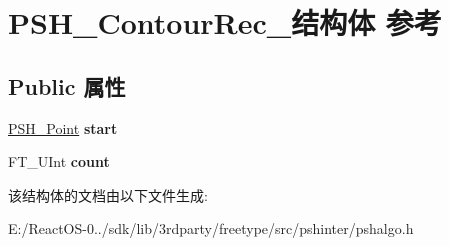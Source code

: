 \hypertarget{struct_p_s_h___contour_rec__}{}\section{P\+S\+H\+\_\+\+Contour\+Rec\+\_\+结构体 参考}
\label{struct_p_s_h___contour_rec__}
\subsection*{Public 属性}
\begin{DoxyCompactItemize}
\item 
\mbox{\label{struct_p_s_h___contour_rec___ada292eef1584e5f887bea69ba8703aa2}} 
\hyperlink{struct_p_s_h___point_rec__}{P\+S\+H\+\_\+\+Point} {\bfseries start}
\item 
\mbox{\label{struct_p_s_h___contour_rec___a5d45ebbfcc7c5cb394ddae2e1b9dacf3}} 
F\+T\+\_\+\+U\+Int {\bfseries count}
\end{DoxyCompactItemize}


该结构体的文档由以下文件生成\+:\begin{DoxyCompactItemize}
\item 
E\+:/\+React\+O\+S-\/0../sdk/lib/3rdparty/freetype/src/pshinter/pshalgo.\+h\end{DoxyCompactItemize}
